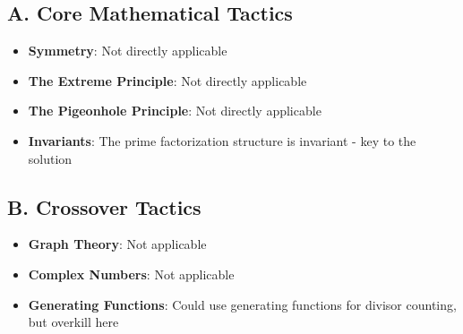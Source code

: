 \documentclass[]{article}
\begin{document}
\begin{tacticalbox}
\subsection*{A. Core Mathematical Tactics}
\begin{itemize}[leftmargin=*]
    \item \textbf{Symmetry}: Not directly applicable
    \item \textbf{The Extreme Principle}: Not directly applicable
    \item \textbf{The Pigeonhole Principle}: Not directly applicable
    \item \textbf{Invariants}: The prime factorization structure is invariant - key to the solution
\end{itemize}

\subsection*{B. Crossover Tactics}
\begin{itemize}[leftmargin=*]
    \item \textbf{Graph Theory}: Not applicable
    \item \textbf{Complex Numbers}: Not applicable
    \item \textbf{Generating Functions}: Could use generating functions for divisor counting, but overkill here
\end{itemize}
\end{tacticalbox}
\end{document}
